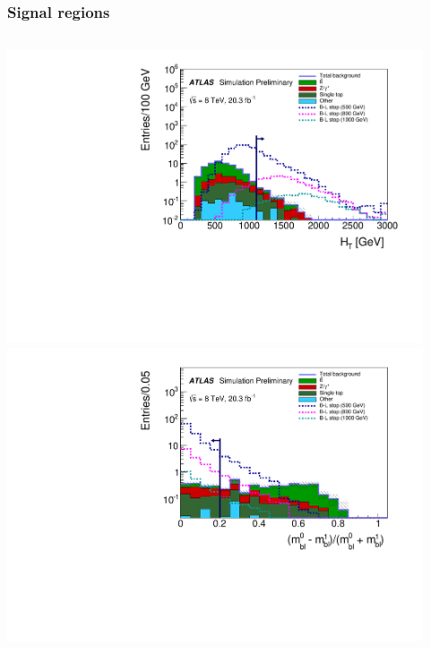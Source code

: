 \documentclass[10pt, svgnames]{beamer}
\begin{document}
\begin{frame}[t]
  \frametitle{Signal regions}
  \begin{columns}
      \begin{center}
        \includegraphics[width=0.92\textwidth]{figures/blstop/ht_sr_400_minus_ht.pdf}
        \\
        \includegraphics[width=0.92\textwidth]{figures/blstop/mbl_asym_sr_400_minus_mbl_asym.pdf}
      \end{center}

\end{columns}
\end{frame}
\end{document}
